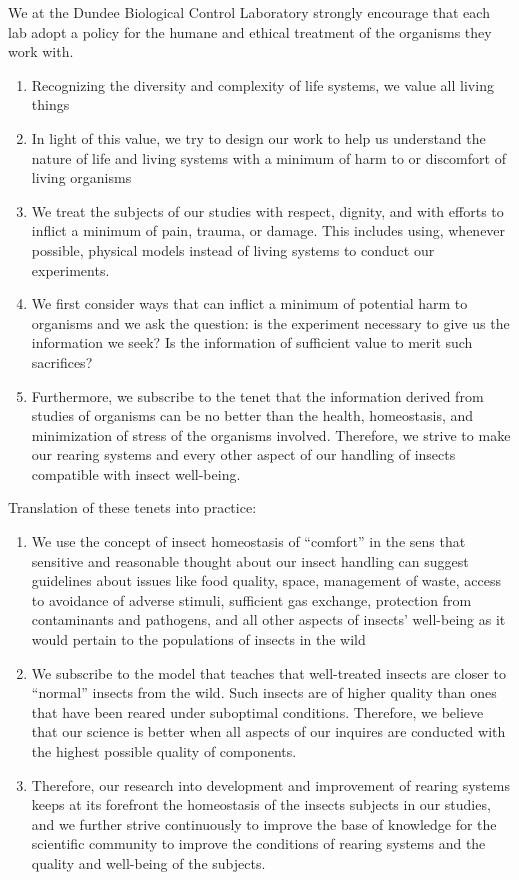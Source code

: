 \documentclass{sop_class}[overrideChapters] %
\providecommand{\tightlist}{%
  \setlength{\itemsep}{0pt}\setlength{\parskip}{0pt}}
\begin{document}
{We at the Dundee Biological Control Laboratory strongly encourage that each lab adopt a policy for the humane and ethical treatment of the organisms they work with.
\begin{enumerate}
\def\labelenumi{\arabic{enumi}.}
\tightlist
\item
  Recognizing the diversity and complexity of life systems, we value all living things
\item
  In light of this value, we try to design our work to help us understand the nature of life and living systems with a minimum of harm to or discomfort of living organisms
\item
  We treat the subjects of our studies with respect, dignity, and with efforts to inflict a minimum of pain, trauma, or damage. This includes using, whenever possible, physical models instead of living systems to conduct our experiments.
\item
  We first consider ways that can inflict a minimum of potential harm to organisms and we ask the question: is the experiment necessary to give us the information we seek? Is the information of sufficient value to merit such sacrifices?
\item
  Furthermore, we subscribe to the tenet that the information derived from studies of organisms can be no better than the health, homeostasis, and minimization of stress of the organisms involved. Therefore, we strive to make our rearing systems and every other aspect of our handling of insects compatible with insect well-being.
\end{enumerate}
Translation of these tenets into practice:
\begin{enumerate}
\def\labelenumi{\arabic{enumi}.}
\tightlist
\item
  We use the concept of insect homeostasis of ``comfort'' in the sens that sensitive and reasonable thought about our insect handling can suggest guidelines about issues like food quality, space, management of waste, access to avoidance of adverse stimuli, sufficient gas exchange, protection from contaminants and pathogens, and all other aspects of insects' well-being as it would pertain to the populations of insects in the wild
\item
  We subscribe to the model that teaches that well-treated insects are closer to ``normal'' insects from the wild. Such insects are of higher quality than ones that have been reared under suboptimal conditions. Therefore, we believe that our science is better when all aspects of our inquires are conducted with the highest possible quality of components.
\item
  Therefore, our research into development and improvement of rearing systems keeps at its forefront the homeostasis of the insects subjects in our studies, and we further strive continuously to improve the base of knowledge for the scientific community to improve the conditions of rearing systems and the quality and well-being of the subjects.
\end{enumerate}
\hypertarget{adult-cages}{%
}}
\end{document}
